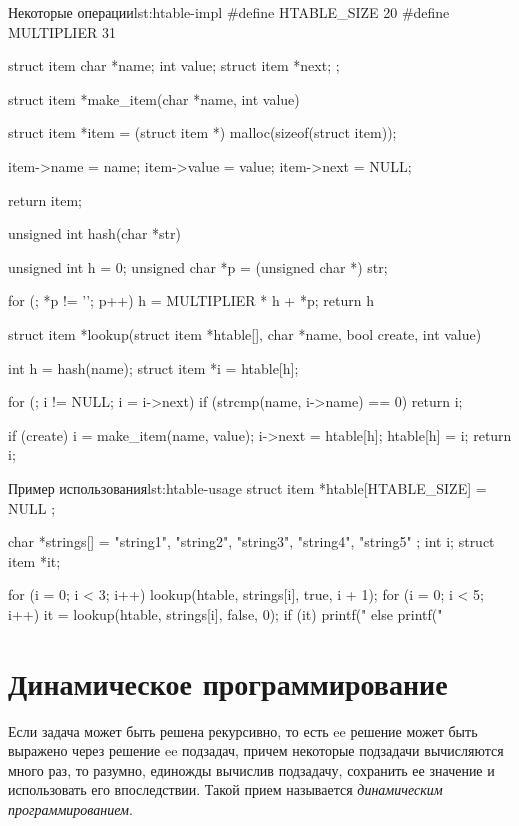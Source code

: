 \begin{clst}{Некоторые операции}{lst:htable-impl}
#define HTABLE_SIZE   20
#define MULTIPLIER    31

struct item {
    char *name;
    int value;
    struct item *next;
};

struct item *make_item(char *name, int value)
{
    struct item *item = (struct item *) malloc(sizeof(struct item));

    item->name = name;
    item->value = value;
    item->next = NULL;

    return item;
}

unsigned int hash(char *str)
{
    unsigned int h = 0;
    unsigned char *p = (unsigned char *) str;

    for (; *p != '\0'; p++)
        h = MULTIPLIER * h + *p;
    return h %
}

struct item *lookup(struct item *htable[], char *name, bool create, int value)
{
    int h = hash(name);
    struct item *i = htable[h];

    for (; i != NULL; i = i->next)
        if (strcmp(name, i->name) == 0)
            return i;

    if (create) {
        i = make_item(name, value);
        i->next = htable[h];
        htable[h] = i;
    }
    return i;
}
\end{clst}

\begin{clst}{Пример использования}{lst:htable-usage}
struct item *htable[HTABLE_SIZE] = { NULL };

char *strings[] = { "string1", "string2", "string3",
                    "string4", "string5" };
int i;
struct item *it;

for (i = 0; i < 3; i++)
    lookup(htable, strings[i], true, i + 1);
for (i = 0; i < 5; i++) {
    it = lookup(htable, strings[i], false, 0);
    if (it)
        printf("%
    else
        printf("%
}
\end{clst}

\section{Динамическое программирование}
\label{sec:dyn-programming}

Если задача может быть решена рекурсивно, то есть ee решение может быть выражено через решение ee подзадач, причем некоторые подзадачи вычисляются много раз, то разумно, единожды вычислив подзадачу, сохранить ее значение и использовать его впоследствии. Такой прием называется \emph{динамическим программированием}.

